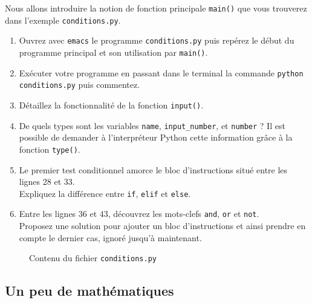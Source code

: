 Nous  allons introduire  la  notion de  fonction
principale   \texttt{main()}  que   vous   trouverez  dans   l'exemple
\texttt{conditions.py}.


\begin{enumerate}


\item  Ouvrez avec  \texttt{emacs} le  programme \texttt{conditions.py}
  puis repérez le début du programme principal et son utilisation par
  \texttt{main()}.

\item Exécuter votre programme en passant dans le terminal la commande
  \texttt{python conditions.py} puis commentez.


\item Détaillez la fonctionnalité de la fonction \texttt{input()}.

\item De quels types sont les variables \texttt{name}, \texttt{input\_number},
et \texttt{number} ? Il est possible de demander à l'interpréteur Python cette information grâce à la fonction \texttt{type()}.


\item Le premier test conditionnel amorce le bloc d'instructions
  situé entre  les lignes 28  et 33.\\ Expliquez la  différence entre
  \texttt{if}, \texttt{elif} et \texttt{else}.

\item  Entre   les  lignes  36   et  43,  découvrez  les   mots-clefs
  \texttt{and}, \texttt{or}  et \texttt{not}.\\ Proposez  une solution
  pour ajouter  un bloc  d'instructions et ainsi  prendre en  compte le
  dernier cas, ignoré jusqu'à maintenant.


\end{enumerate}


\begin{figure}  
  
  \caption{Contenu du fichier \texttt{conditions.py}}
  \label{polynome_conditions}
\end{figure}




\subsection{Un peu de mathématiques}

